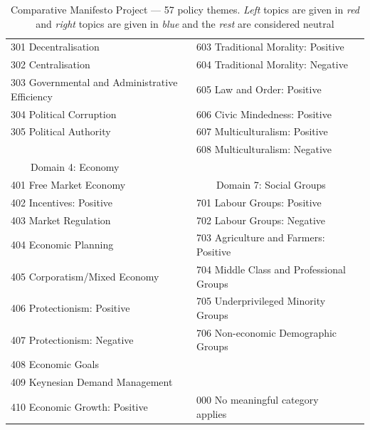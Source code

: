 \documentclass[11pt,a4paper]{article}
\newcommand{\tabitem}{~~\llap{\textbullet}~~}
\begin{document}
\begin{small}
\begin{table}
\begin{tabular}{lll}
\\
  301 Decentralisation & \color{blue}  603 Traditional Morality: Positive
\\
  302 Centralisation &   604 Traditional Morality: Negative
\\
  303 Governmental and Administrative Efficiency &  \color{blue}  605 Law and Order: Positive
\\
  304 Political Corruption &  \color{blue} 606 Civic Mindedness: Positive
\\
  \color{blue} 305 Political Authority &   607 Multiculturalism: Positive
\\
&   608 Multiculturalism: Negative\\
\tabitem Domain 4: Economy  & \\
 \color{blue} 401 Free Market Economy & \tabitem Domain 7: Social Groups\\
 \color{blue} 402 Incentives: Positive & \color{red} 701 Labour Groups: Positive\\
\color{red}  403 Market Regulation & 702 Labour Groups: Negative\\
\color{red}  404 Economic Planning & 703 Agriculture and Farmers: Positive\\
  405 Corporatism/Mixed Economy & 704 Middle Class and Professional Groups\\
\color{red}  406 Protectionism: Positive & 705 Underprivileged Minority Groups\\
\color{blue}  407 Protectionism: Negative & 706 Non-economic Demographic Groups\\
  408 Economic Goals & \\
  409 Keynesian Demand Management & \\
  410 Economic Growth: Positive & 000 No meaningful category applies\\
    \bottomrule   
  \end{tabular}
  \caption{Comparative Manifesto Project --- 57 policy themes. \textit{Left} topics are given in \textit{\color{red}red} and \textit{right} topics are given in \textit{\color{blue}blue} and the \textit{\color{black}rest} are considered neutral}
  \label{fig:CMP}
\end{table}
\end{small}
\end{document}
